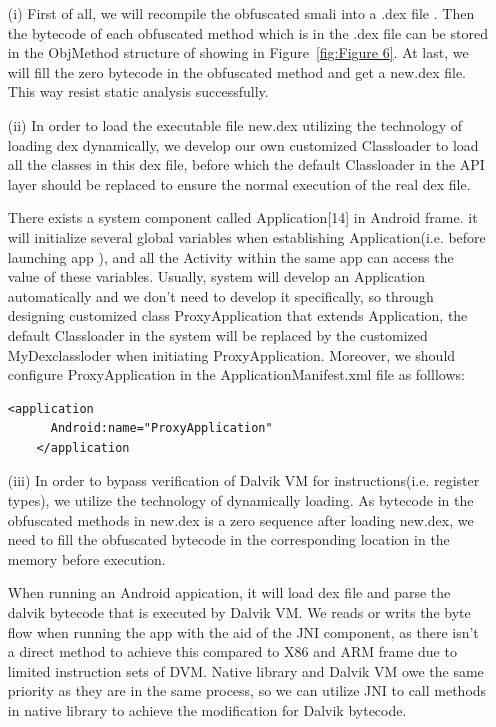 \begin{enumerate}[leftmargin=*]
\item[(i)] First of all, we will recompile the obfuscated smali into a .dex file . Then the bytecode of each obfuscated method which is in the .dex file can be stored in the ObjMethod structure of showing in Figure~\ref{fig:Figure 6}. At last, we will fill the zero bytecode in the obfuscated method and get a new.dex file. This way resist static analysis successfully.

\item[(ii)] In order to load the executable file new.dex utilizing the technology of loading dex dynamically, we develop our own customized Classloader to load all the classes in this dex file, before which the default Classloader in the API layer should be replaced to ensure the normal execution of the real dex file.

    There exists a system component called Application[14] in Android frame. it will initialize several global variables when establishing Application(i.e. before launching app ),  and all the Activity within the same app can access the value of these variables. Usually, system will develop an Application automatically and we don't need to develop it specifically, so through designing customized class ProxyApplication that extends  Application, the default Classloader in the system will be replaced by the customized MyDexclassloder when initiating ProxyApplication. Moreover, we should configure ProxyApplication in the ApplicationManifest.xml file as folllows:
    \begin{lstlisting}[language={[ANSI]C}, backgroundcolor=\color{backcolour},keywordstyle=\color{blue!70},commentstyle=\color{red!50!green!50!blue!50}]
    <application
      Android:name="ProxyApplication"
    </application
    \end{lstlisting}


\item[(iii)] In order to bypass verification of Dalvik VM for instructions(i.e. register types), we utilize  the technology of dynamically loading. As bytecode in the obfuscated  methods  in new.dex is a zero sequence after loading new.dex, we need to fill the obfuscated bytecode in the corresponding location in the memory before execution.

    \par When running an Android appication, it will load dex file and parse the dalvik bytecode that is executed by Dalvik VM. We reads or writs the byte flow when running the app with the aid of the JNI component\cite{15}, as there isn't a direct method to achieve this compared to X86 and ARM frame due to limited instruction sets of DVM. Native library and Dalvik VM owe the same priority as they are in the same process, so we can utilize JNI to call methods in native library to achieve the modification for Dalvik bytecode.


\end{enumerate}
